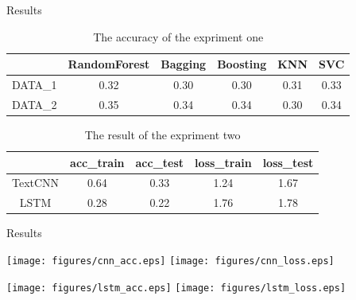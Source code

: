 \documentclass[
 size=14pt,
 paper=smartboard,  %
 mode=present, 		%
 display=slides, 	%
 style=tuliplab,  	%
 pauseslide,
 fleqn,leqno]{powerdot}
\begin{document}
\begin{slide}[toc=,bm=]{Results}
	
	\begin{table}[tb]
		\setlength{\abovecaptionskip}{0pt}
		\setlength{\belowcaptionskip}{10pt}
		\centering
		\caption{The accuracy of the expriment one}
		
		\begin{tabular}{cccccc}
			\toprule
			& RandomForest  & Bagging & Boosting & KNN & SVC\\
			\midrule
			DATA\_1&  0.32 &  0.30 &  0.30 & 0.31 & 0.33\\
			DATA\_2 &  0.35 &  0.34 &  0.34 & 0.30 & 0.34\\
			\bottomrule
		\end{tabular}
	\end{table}
	
	\begin{table}[tb]
		\setlength{\abovecaptionskip}{0pt}
		\setlength{\belowcaptionskip}{10pt}
		\centering
		\caption{The result of the expriment two}
		
		\begin{tabular}{ccccc}
			\toprule
			& acc_train  & acc_test & loss_train & loss_test \\
			\midrule
			TextCNN&  0.64 &  0.33 &  1.24 & 1.67 \\
			LSTM &  0.28 &  0.22 &  1.76 & 1.78 \\
			\bottomrule
		\end{tabular}
	\end{table}
	
\end{slide}


\begin{slide}[toc=,bm=]{Results}
	\begin{center}
		\texttt{[image: figures/cnn\_acc.eps]}
		\quad\texttt{[image: figures/cnn\_loss.eps]}
	\end{center}
	
	\begin{center}
		\texttt{[image: figures/lstm\_acc.eps]}
		\quad\texttt{[image: figures/lstm\_loss.eps]}
	\end{center}
	
\end{slide}
\end{document}
